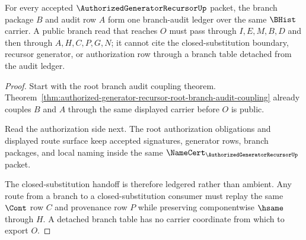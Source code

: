 \begin{theorem}
\label{thm:authorized-generator-recursor-branch-audit-ledger}
For every accepted $\AuthorizedGeneratorRecursorUp$ packet, the branch package $B$ and audit row $A$ form one branch-audit ledger over the same $\BHist$ carrier. A public branch read that reaches $O$ must pass through $I,E,M,B,D$ and then through $A,H,C,P,G,N$; it cannot cite the closed-substitution boundary, recursor generator, or authorization row through a branch table detached from the audit ledger.
\end{theorem}
\begin{proof}
Start with the root branch audit coupling theorem. Theorem~\ref{thm:authorized-generator-recursor-root-branch-audit-coupling} already couples $B$ and $A$ through the same displayed carrier before $O$ is public.

Read the authorization side next. The root authorization obligations and displayed route surface keep accepted signatures, generator rows, branch packages, and local naming inside the same $\NameCert_{\AuthorizedGeneratorRecursorUp}$ packet.

The closed-substitution handoff is therefore ledgered rather than ambient. Any route from a branch to a closed-substitution consumer must replay the same $\Cont$ row $C$ and provenance row $P$ while preserving componentwise $\hsame$ through $H$. A detached branch table has no carrier coordinate from which to export $O$.
\end{proof}

